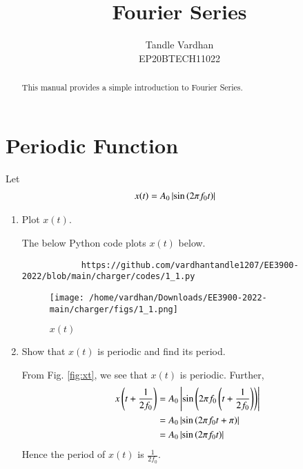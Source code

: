 \documentclass[journal,12pt,twocolumn]{IEEEtran}
\renewcommand\thesection{\arabic{section}}
\begin{document}
	\vspace{3cm}
	\title{Fourier Series}
	\author{Tandle Vardhan\\EP20BTECH11022}
	\maketitle
	\tableofcontents
	\renewcommand{\thefigure}{\theenumi}
	\renewcommand{\thetable}{\theenumi}
	\bigskip
	\begin{abstract}
		This manual provides a simple introduction to Fourier Series.
	\end{abstract}
	\section{Periodic Function}
	Let 
	\begin{align}
		x(t) &= A_0\left\vert\sin\left(2\pi f_0 t\right)\right\vert
		\label{eq:10-orig-diff-def}
	\end{align}
	\begin{enumerate}[label=\thesection.\arabic*
		,ref=\thesection.\theenumi]
		\item Plot $x(t)$.
		
		\solution The below Python code plots $x(t)$ below.
		\begin{lstlisting}
			https://github.com/vardhantandle1207/EE3900-2022/blob/main/charger/codes/1_1.py
		\end{lstlisting}
		\begin{figure}[!htp]
			\texttt{[image: /home/vardhan/Downloads/EE3900-2022-main/charger/figs/1\_1.png]}
			\caption{$x(t)$}
			\label{fig:xt}
		\end{figure}
		\item Show that $x(t)$ is periodic and find its period.
		
		\solution From Fig. \eqref{fig:xt}, we see that $x(t)$ is periodic. Further,
		\begin{align}
			x\left(t+\frac{1}{2f_0}\right) &= A_0\left\vert\sin\left(2\pi f_0\left(t + \frac{1}{2f_0}\right)\right)\right\vert \\
			&= A_0\left\vert\sin\left(2\pi f_0t + \pi\right)\right\vert \\
			&= A_0\left\vert\sin\left(2\pi f_0t\right)\right\vert
		\end{align}
		Hence the period of $x(t)$ is $\frac{1}{2f_0}$.
	\end{enumerate}
\end{document}
